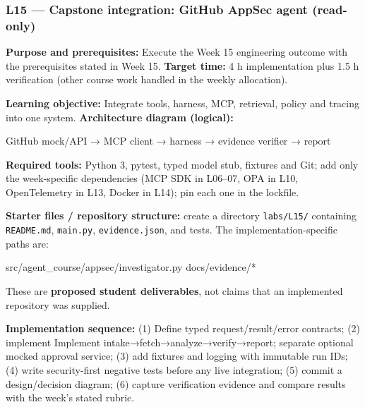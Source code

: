 \documentclass[
  10pt,
]{article}
\newenvironment{Shaded}{\begin{snugshade}}{\end{snugshade}}
\newcommand{\NormalTok}[1]{#1}
\begin{document}
\subsubsection{L15 --- Capstone integration: GitHub AppSec agent
(read-only)}\label{l15-capstone-integration-github-appsec-agent-read-only}

\textbf{Purpose and prerequisites:} Execute the Week 15 engineering
outcome with the prerequisites stated in Week 15. \textbf{Target time:}
4 h implementation plus 1.5 h verification (other course work handled in
the weekly allocation).

\textbf{Learning objective:} Integrate tools, harness, MCP, retrieval,
policy and tracing into one system. \textbf{Architecture diagram
(logical):}

\begin{Shaded}
\begin{Highlighting}[]
\NormalTok{GitHub mock/API → MCP client → harness → evidence}
\NormalTok{verifier → report}
\end{Highlighting}
\end{Shaded}

\textbf{Required tools:} Python 3, pytest, typed model stub, fixtures
and Git; add only the week-specific dependencies (MCP SDK in L06--07,
OPA in L10, OpenTelemetry in L13, Docker in L14); pin each one in the
lockfile.

{\raggedright \textbf{Starter files / repository structure:} create a directory
\texttt{labs/\allowbreak L15/} containing \texttt{README.md}, \texttt{main.py},
\texttt{evidence.json}, and tests. The implementation-specific paths
are:\par}

\begin{Shaded}
\begin{Highlighting}[]
\NormalTok{src/agent\_course/appsec/investigator.py}
\NormalTok{docs/evidence/*}
\end{Highlighting}
\end{Shaded}

These are \textbf{proposed student deliverables}, not claims that an
implemented repository was supplied.

{\raggedright \textbf{Implementation sequence:} (1) Define typed request/\allowbreak result/\allowbreak error
contracts; (2) implement Implement intake→\allowbreak fetch→\allowbreak analyze→\allowbreak verify→\allowbreak report;
separate optional mocked approval service; (3) add fixtures and logging
with immutable run IDs; (4) write security-first negative tests before
any live integration; (5) commit a design/\allowbreak decision diagram; (6) capture
verification evidence and compare results with the week's stated rubric.\par}
\end{document}
